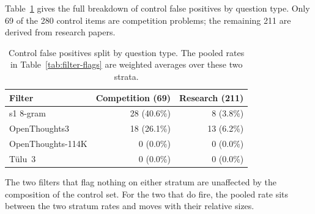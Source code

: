 \documentclass[11pt]{article}
\begin{document}
Table~\ref{tab:strata} gives the full breakdown of control false positives by question type. Only 69 of the 280 control items are competition problems; the remaining 211 are derived from research papers.

\begin{table}[!t]
\centering
\small
\begin{tabular}{@{}lrr@{}}
\toprule
Filter & Competition (69) & Research (211) \\
\midrule
s1 8-gram         & 28 (40.6\%) & 8 (3.8\%) \\
OpenThoughts3     & 18 (26.1\%) & 13 (6.2\%) \\
OpenThoughts-114K & 0 (0.0\%)   & 0 (0.0\%) \\
T\"ulu~3          & 0 (0.0\%)   & 0 (0.0\%) \\
\bottomrule
\end{tabular}
\caption{Control false positives split by question type. The pooled rates in Table~\ref{tab:filter-flags} are weighted averages over these two strata.}
\label{tab:strata}
\end{table}

The two filters that flag nothing on either stratum are unaffected by the composition of the control set. For the two that do fire, the pooled rate sits between the two stratum rates and moves with their relative sizes.
\end{document}
